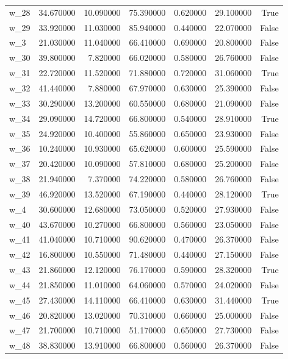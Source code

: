 \begin{table}
\begin{tabular}{lrrrrrr}
w\_28 & 34.670000 & 10.090000 & 75.390000 & 0.620000 & 29.100000 & True \\
w\_29 & 33.920000 & 11.030000 & 85.940000 & 0.440000 & 22.070000 & False \\
w\_3 & 21.030000 & 11.040000 & 66.410000 & 0.690000 & 20.800000 & False \\
w\_30 & 39.800000 & 7.820000 & 66.020000 & 0.580000 & 26.760000 & False \\
w\_31 & 22.720000 & 11.520000 & 71.880000 & 0.720000 & 31.060000 & True \\
w\_32 & 41.440000 & 7.880000 & 67.970000 & 0.630000 & 25.390000 & False \\
w\_33 & 30.290000 & 13.200000 & 60.550000 & 0.680000 & 21.090000 & False \\
w\_34 & 29.090000 & 14.720000 & 66.800000 & 0.540000 & 28.910000 & True \\
w\_35 & 24.920000 & 10.400000 & 55.860000 & 0.650000 & 23.930000 & False \\
w\_36 & 10.240000 & 10.930000 & 65.620000 & 0.600000 & 25.590000 & False \\
w\_37 & 20.420000 & 10.090000 & 57.810000 & 0.680000 & 25.200000 & False \\
w\_38 & 21.940000 & 7.370000 & 74.220000 & 0.580000 & 26.760000 & False \\
w\_39 & 46.920000 & 13.520000 & 67.190000 & 0.440000 & 28.120000 & True \\
w\_4 & 30.600000 & 12.680000 & 73.050000 & 0.520000 & 27.930000 & False \\
w\_40 & 43.670000 & 10.270000 & 66.800000 & 0.560000 & 23.050000 & False \\
w\_41 & 41.040000 & 10.710000 & 90.620000 & 0.470000 & 26.370000 & False \\
w\_42 & 16.800000 & 10.550000 & 71.480000 & 0.440000 & 27.150000 & False \\
w\_43 & 21.860000 & 12.120000 & 76.170000 & 0.590000 & 28.320000 & True \\
w\_44 & 21.850000 & 11.010000 & 64.060000 & 0.570000 & 24.020000 & False \\
w\_45 & 27.430000 & 14.110000 & 66.410000 & 0.630000 & 31.440000 & True \\
w\_46 & 20.820000 & 13.020000 & 70.310000 & 0.660000 & 25.000000 & False \\
w\_47 & 21.700000 & 10.710000 & 51.170000 & 0.650000 & 27.730000 & False \\
w\_48 & 38.830000 & 13.910000 & 66.800000 & 0.560000 & 26.370000 & False \\

\end{tabular}
\end{table}
